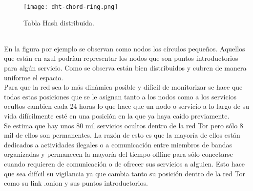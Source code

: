 \begin{figure}[h]
	\centering
	\texttt{[image: dht-chord-ring.png]}
	\caption{Tabla Hash distribuida.}
\end{figure}\\
En la figura por ejemplo se observan como nodos los círculos pequeños. Aquellos que están en azul podrían representar los nodos que son puntos introductorios para algún servicio. Como se observa están bien distribuidos y cubren de manera uniforme el espacio.\\
Para que la red sea lo más dinámica posible y difícil de monitorizar se hace que todas estas posiciones que se le asignan tanto a los nodos como a los servicios ocultos cambien cada 24 horas lo que hace que un nodo o servicio a lo largo de su vida difícilmente esté en una posición en la que ya haya caído previamente.\\
Se estima que hay unos 80 mil servicios ocultos dentro de la red Tor pero sólo 8 mil de ellos son permanentes. La razón de esto es que la mayoría de ellos están dedicados a actividades ilegales o a comunicación entre miembros de bandas organizadas y permanecen la mayoría del tiempo offline para sólo conectarse cuando requieren de comunicación o de ofrecer sus servicios a alguien. Esto hace que sea difícil su vigilancia ya que cambia tanto su posición dentro de la red Tor como su link .onion y sus puntos introductorios.
